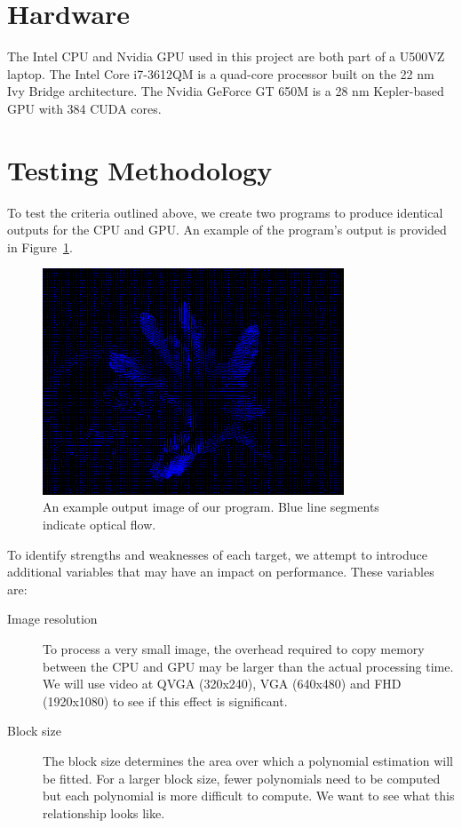 \documentclass[12pt,letterpaper]{article}
\begin{document}
\section{Hardware}
The Intel CPU and Nvidia GPU used in this project are both part of a U500VZ
laptop. The Intel Core i7-3612QM is a quad-core processor built on the 22 nm
Ivy Bridge architecture. The Nvidia GeForce GT 650M is a 28 nm Kepler-based GPU
with 384 CUDA cores.

\section{Testing Methodology}
To test the criteria outlined above, we create two programs to produce
identical outputs for the CPU and GPU. An example of the program's output is
provided in Figure~\ref{fig:flow}.

\begin{figure}[h]
  \centering
  \includegraphics[width=0.8\textwidth]{img/flow.png}
  \caption{An example output image of our program. Blue line segments indicate optical flow.}
  \label{fig:flow}
\end{figure}

To identify strengths and weaknesses of each target, we attempt to
introduce additional variables that may have an impact on performance. These
variables are:

\begin{description}
  \item[Image resolution] To process a very small image, the overhead required
    to copy memory between the CPU and GPU may be larger than the actual
    processing time. We will use video at QVGA (320x240), VGA (640x480) and FHD
    (1920x1080) to see if this effect is significant.
  \item[Block size] The block size determines the area over which a polynomial
    estimation will be fitted. For a larger block size, fewer polynomials need
    to be computed but each polynomial is more difficult to compute. We want to
    see what this relationship looks like.
\end{description}
\end{document}
